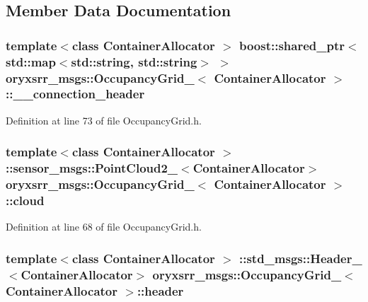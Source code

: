 \subsection{\-Member \-Data \-Documentation}
\subsubsection[{\-\_\-\-\_\-connection\-\_\-header}]{\setlength{\rightskip}{0pt plus 5cm}template$<$class Container\-Allocator $>$ boost\-::shared\-\_\-ptr$<$std\-::map$<$std\-::string, std\-::string$>$ $>$ {\bf oryxsrr\-\_\-msgs\-::\-Occupancy\-Grid\-\_\-}$<$ \-Container\-Allocator $>$\-::{\bf \-\_\-\-\_\-connection\-\_\-header}}\label{structoryxsrr__msgs_1_1OccupancyGrid___af2f7f807737bd807414fb21a40b05f38}


\-Definition at line 73 of file \-Occupancy\-Grid.\-h.

\subsubsection[{cloud}]{\setlength{\rightskip}{0pt plus 5cm}template$<$class Container\-Allocator $>$ \-::sensor\-\_\-msgs\-::\-Point\-Cloud2\-\_\-$<$\-Container\-Allocator$>$ {\bf oryxsrr\-\_\-msgs\-::\-Occupancy\-Grid\-\_\-}$<$ \-Container\-Allocator $>$\-::{\bf cloud}}\label{structoryxsrr__msgs_1_1OccupancyGrid___ad2173f6d3da556dce12f1daf0d9277ce}


\-Definition at line 68 of file \-Occupancy\-Grid.\-h.

\subsubsection[{header}]{\setlength{\rightskip}{0pt plus 5cm}template$<$class Container\-Allocator $>$ \-::std\-\_\-msgs\-::\-Header\-\_\-$<$\-Container\-Allocator$>$ {\bf oryxsrr\-\_\-msgs\-::\-Occupancy\-Grid\-\_\-}$<$ \-Container\-Allocator $>$\-::{\bf header}}\label{structoryxsrr__msgs_1_1OccupancyGrid___ad8a6bb560ee1edc08da4f3e3f7583a0d}


